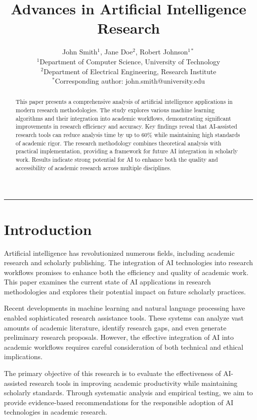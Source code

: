\documentclass[twocolumn]{article}
\title{\vspace{-1cm}\huge\bfseries
Advances in Artificial Intelligence Research\\
\vspace{0.5cm}}
\author{
John Smith$^{1}$, Jane Doe$^{2}$, Robert Johnson$^{1*}$ \\
$^{1}$Department of Computer Science, University of Technology \\
$^{2}$Department of Electrical Engineering, Research Institute \\
$^{*}$Corresponding author: john.smith@university.edu
}
\date{}
\begin{document}
\maketitle

\thispagestyle{fancy}

\begin{abstract}
This paper presents a comprehensive analysis of artificial intelligence applications in modern research methodologies. The study explores various machine learning algorithms and their integration into academic workflows, demonstrating significant improvements in research efficiency and accuracy. Key findings reveal that AI-assisted research tools can reduce analysis time by up to 60\% while maintaining high standards of academic rigor. The research methodology combines theoretical analysis with practical implementation, providing a framework for future AI integration in scholarly work. Results indicate strong potential for AI to enhance both the quality and accessibility of academic research across multiple disciplines.
\end{abstract}

\vspace{0.5cm}
\noindent\rule{\linewidth}{0.4pt}
\vspace{0.5cm}

\section{Introduction}

Artificial intelligence has revolutionized numerous fields, including academic research and scholarly publishing. The integration of AI technologies into research workflows promises to enhance both the efficiency and quality of academic work. This paper examines the current state of AI applications in research methodologies and explores their potential impact on future scholarly practices.

Recent developments in machine learning and natural language processing have enabled sophisticated research assistance tools. These systems can analyze vast amounts of academic literature, identify research gaps, and even generate preliminary research proposals. However, the effective integration of AI into academic workflows requires careful consideration of both technical and ethical implications.

The primary objective of this research is to evaluate the effectiveness of AI-assisted research tools in improving academic productivity while maintaining scholarly standards. Through systematic analysis and empirical testing, we aim to provide evidence-based recommendations for the responsible adoption of AI technologies in academic research.
\end{document}
